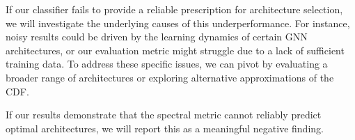 \documentclass[11pt]{article}
\begin{document}
If our classifier fails to provide a reliable prescription for architecture selection, we will investigate the underlying causes of this underperformance. For instance, noisy results could be driven by the learning dynamics of certain GNN architectures, or our evaluation metric might struggle due to a lack of sufficient training data. To address these specific issues, we can pivot by evaluating a broader range of architectures or exploring alternative approximations of the CDF.

If our results demonstrate that the spectral metric cannot reliably predict optimal architectures, we will report this as a meaningful negative finding.

\pagebreak



\end{document}
